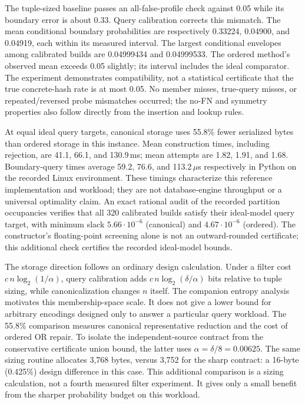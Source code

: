\documentclass[../main.tex]{subfiles}
\begin{document}
The tuple-sized baseline passes an all-false-profile check against 0.05
while its boundary error is about 0.33. Query calibration corrects this
mismatch. The mean conditional boundary probabilities are respectively
0.33224, 0.04900, and 0.04919, each within its measured interval.
The largest conditional envelopes among calibrated builds are 0.04999434
and 0.04999533. The ordered method's observed mean exceeds 0.05 slightly;
its interval includes the ideal comparator. The experiment demonstrates
compatibility, not a statistical certificate that the true concrete-hash
rate is at most 0.05. No member misses, true-query misses, or repeated/reversed
probe mismatches occurred; the no-FN and symmetry properties also follow
directly from the insertion and lookup rules.

At equal ideal query targets, canonical storage uses 55.8\% fewer serialized
bytes than ordered storage in this instance. Mean construction times,
including rejection, are 41.1, 66.1, and 130.9\,ms; mean attempts are
1.82, 1.91, and 1.68. Boundary-query times average 59.2, 76.6, and
113.2\,$\mu$s respectively in Python on the recorded Linux environment.
These timings characterize this reference implementation and workload;
they are not database-engine throughput or a universal optimality claim.
An exact rational audit of the recorded partition occupancies verifies that
all 320 calibrated builds satisfy their ideal-model query target, with minimum
slack $5.66\cdot10^{-6}$ (canonical) and $4.67\cdot10^{-6}$ (ordered).
The constructor's floating-point screening alone is not an outward-rounded
certificate; this additional check certifies the recorded ideal-model bounds.

The storage direction follows an ordinary design calculation. Under a
filter cost $c\,n\log_2(1/\alpha)$, query calibration adds
$c\,n\log_2(\delta/\alpha)$ bits relative to tuple sizing, while
canonicalization changes $n$ itself. The companion entropy analysis
\cite{bernoulliEntropy} motivates this membership-space scale. It does not
give a lower bound for arbitrary encodings designed only to answer a
particular query workload.
The 55.8\% comparison measures canonical representative reduction and the
cost of ordered OR repair. To isolate the independent-source contract from
the conservative certificate union bound, the latter uses
$\alpha=\delta/8=0.00625$. The same sizing routine allocates 3,768 bytes,
versus 3,752 for the sharp contract: a 16-byte (0.425\%) design difference
in this case. This additional comparison is a sizing calculation, not a
fourth measured filter experiment. It gives only a small benefit from the
sharper probability budget on this workload.
\end{document}
